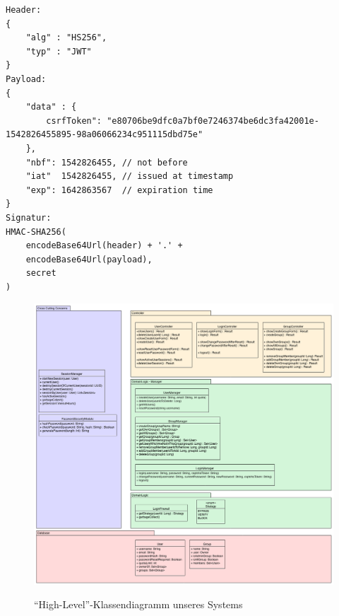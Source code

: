 \documentclass[12pt,DIV14,BCOR10mm,a4paper,parskip=half-,headsepline,headinclude,english,ngerman,bibliography=totocnumbered]{scrreprt}
\begin{document}
\iftotalfigures
  \listoffigures
\fi


\begin{appendices}

\begin{sloppypar}
\begin{lstlisting}[label=jwtformat, caption={Aufbau eines JSON Web Token},captionpos=b]
Header:
{
	"alg" : "HS256",
	"typ" : "JWT"
}
Payload:
{
	"data" : {
		csrfToken": "e80706be9dfc0a7bf0e7246374be6dc3fa42001e-1542826455895-98a06066234c951115dbd75e"
	},
	"nbf": 1542826455, // not before
	"iat"  1542826455, // issued at timestamp
	"exp": 1642863567  // expiration time
}
Signatur:
HMAC-SHA256(
	encodeBase64Url(header) + '.' +
	encodeBase64Url(payload),
	secret
)
\end{lstlisting}
\end{sloppypar}

\begin{figure}[!htb]
	\hspace*{-2.5cm}
	\includegraphics[width=0.93\paperwidth]{resources/class_diagram.png}
	\label{architecture:class_diagram}
	\caption{\enquote{High-Level}-Klassendiagramm unseres Systems}
\end{figure}


\end{appendices}
\end{document}

